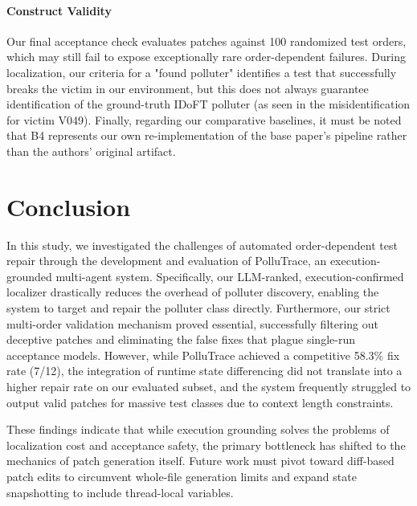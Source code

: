 \documentclass[conference]{IEEEtran}
\begin{document}
\paragraph{Construct Validity} Our final acceptance check evaluates patches against 100 randomized test orders, which may still fail to expose exceptionally rare order-dependent failures. During localization, our criteria for a "found polluter" identifies a test that successfully breaks the victim in our environment, but this does not always guarantee identification of the ground-truth IDoFT polluter (as seen in the misidentification for victim V049). Finally, regarding our comparative baselines, it must be noted that B4 represents our own re-implementation of the base paper's pipeline rather than the authors' original artifact. 

\section{Conclusion}
\label{sec:conclusion}
In this study, we investigated the challenges of automated order-dependent test repair through the development and evaluation of PolluTrace, an execution-grounded multi-agent system. Specifically, our LLM-ranked, execution-confirmed localizer drastically reduces the overhead of polluter discovery, enabling the system to target and repair the polluter class directly. Furthermore, our strict multi-order validation mechanism proved essential, successfully filtering out deceptive patches and eliminating the false fixes that plague single-run acceptance models. However, while PolluTrace achieved a competitive 58.3\% fix rate (7/12), the integration of runtime state differencing did not translate into a higher repair rate on our evaluated subset, and the system frequently struggled to output valid patches for massive test classes due to context length constraints.

These findings indicate that while execution grounding solves the problems of localization cost and acceptance safety, the primary bottleneck has shifted to the mechanics of patch generation itself. Future work must pivot toward diff-based patch edits to circumvent whole-file generation limits and expand state snapshotting to include thread-local variables.


\end{document}
